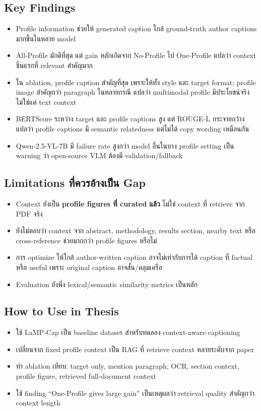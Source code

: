 \documentclass[10pt,a4paper]{article}
\begin{document}
\subsection{Key Findings}
\begin{itemize}
\item Profile information ช่วยให้ generated caption ใกล้ ground-truth author captions มากขึ้นในหลาย model
\item All-Profile มักดีที่สุด แต่ gain หลักเกิดจาก No-Profile ไป One-Profile แปลว่า context ชิ้นแรกที่ relevant สำคัญมาก
\item ใน ablation, profile caption สำคัญที่สุด เพราะให้ทั้ง style และ target format; profile image สำคัญกว่า paragraph ในหลายกรณี แปลว่า multimodal profile มีประโยชน์จริง ไม่ใช่แค่ text context
\item BERTScore ระหว่าง target และ profile captions สูง แต่ ROUGE-L กระจายกว้าง แปลว่า profile captions มี semantic relatedness แต่ไม่ได้ copy wording เหมือนกัน
\item Qwen-2.5-VL-7B มี failure rate สูงกว่า model อื่นในบาง profile setting เป็น warning ว่า open-source VLM ต้องมี validation/fallback
\end{itemize}

\subsection{Limitations ที่ควรอ้างเป็น Gap}
\begin{itemize}
\item Context ยังเป็น \textbf{profile figures ที่ curated แล้ว} ไม่ใช่ context ที่ retrieve จาก PDF จริง
\item ยังไม่ตอบว่า context จาก abstract, methodology, results section, nearby text หรือ cross-reference ช่วยมากกว่า profile figures หรือไม่
\item การ optimize ให้ใกล้ author-written caption อาจไม่เท่ากับการได้ caption ที่ factual หรือ useful เพราะ original caption อาจสั้น/คลุมเครือ
\item Evaluation ยังพึ่ง lexical/semantic similarity metrics เป็นหลัก
\end{itemize}

\subsection{How to Use in Thesis}
\begin{itemize}
\item ใช้ LaMP-Cap เป็น baseline dataset สำหรับทดลอง context-aware captioning
\item เปลี่ยนจาก fixed profile context เป็น RAG ที่ retrieve context หลายระดับจาก paper
\item ทำ ablation เทียบ: target only, mention paragraph, OCR, section context, profile figure, retrieved full-document context
\item ใช้ finding ``One-Profile gives large gain'' เป็นเหตุผลว่า retrieval quality สำคัญกว่า context length
\end{itemize}
\end{document}
